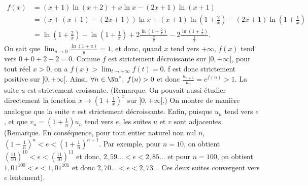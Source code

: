 {{\begin{align*}
f(x)&=(x+1)\ln(x+2)+x\ln x-(2x+1)\ln(x+1)\\
 &=(x+(x+1)-(2x+1))\ln x+(x+1)\ln\left(1+\frac{2}{x}\right)-(2x+1)\ln\left(1+\frac{1}{x}\right)\\
 &=\ln\left(1+\frac{2}{x}\right)-\ln\left(1+\frac{1}{x}\right)+2\frac{\ln\left(1+\frac{2}{x}\right)}{\frac{2}{x}}-2\frac{\ln\left(1+\frac{1}{x}\right)}{\frac{1}{x}}.
\end{align*}
On sait que $\lim_{u\rightarrow 0}\frac{\ln(1+u)}{u}=1$, et donc, quand $x$ tend vers $+\infty$, $f(x)$ tend vers $0+0+2-2=0$. Comme $f$ est strictement décroissante sur $]0,+\infty[$, pour tout réel $x>0$, on a $f(x)>\lim_{t\rightarrow +\infty}f(t)=0$.
f est donc strictement positive sur $]0,+\infty[$. Ainsi, $\forall n\in\Nn^*,\;f(n)>0$ et donc $\frac{u_{n+1}}{u_n}=e^{f(n)}>1$. La suite $u$ est strictement croissante.
(Remarque. On pouvait aussi étudier directement la fonction $x\mapsto\left(1+\frac{1}{x}\right)^x$ sur $]0,+\infty[$.)
On montre de manière analogue que la suite $v$ est strictement décroissante. Enfin, puisque $u_n$ tend vers $e$, et que $v_n=\left(1+\frac{1}{n}\right)u_n$ tend vers $e$, les suites $u$ et $v$ sont adjacentes.
(Remarque. En conséquence, pour tout entier naturel non nul $n$, $\left(1+\frac{1}{n}\right)^n<e<\left(1+\frac{1}{n}\right)^{n+1}$. Par exemple, pour $n=10$, on obtient $\left(\frac{11}{10}\right)^{10}<e<\left(\frac{11}{10}\right)^{11}$ et donc, $2,59...<e<2,85...$ et pour $n=100$, on obtient $1,01^{100}<e<1,01^{101}$ et donc $2,70...<e<2,73...$ Ces deux suites convergent vers $e$ lentement).
}
}
